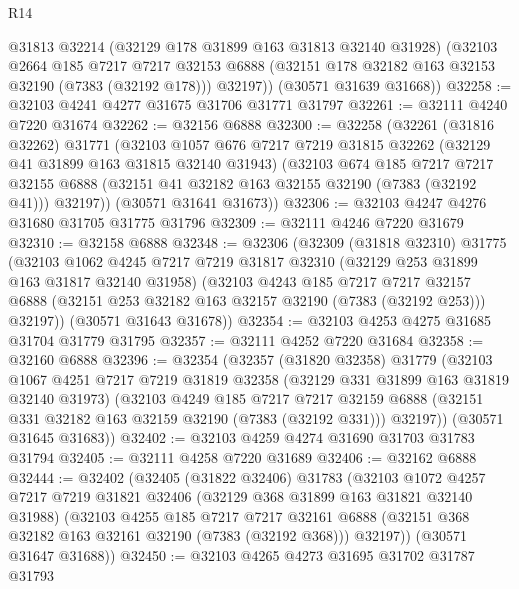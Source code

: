 \begin{lexlean}{R14}
\begin{coremodule}
        @31813
        @32214
        (@32129 @178 @31899 @163 @31813 @32140 @31928)
        (@32103
          @2664
          @185
          @7217
          @7217
          @32153
          @6888
          (@32151 @178 @32182 @163 @32153 @32190 (@7383 (@32192 @178)))
          @32197))
      (@30571 @31639 @31668))
@32258 := @32103 @4241 @4277 @31675 @31706 @31771 @31797
@32261 := @32111 @4240 @7220 @31674
@32262 := @32156 @6888
@32300 := @32258
    (@32261
      (@31816 @32262)
      @31771
      (@32103
        @1057
        @676
        @7217
        @7219
        @31815
        @32262
        (@32129 @41 @31899 @163 @31815 @32140 @31943)
        (@32103
          @674
          @185
          @7217
          @7217
          @32155
          @6888
          (@32151 @41 @32182 @163 @32155 @32190 (@7383 (@32192 @41)))
          @32197))
      (@30571 @31641 @31673))
@32306 := @32103 @4247 @4276 @31680 @31705 @31775 @31796
@32309 := @32111 @4246 @7220 @31679
@32310 := @32158 @6888
@32348 := @32306
    (@32309
      (@31818 @32310)
      @31775
      (@32103
        @1062
        @4245
        @7217
        @7219
        @31817
        @32310
        (@32129 @253 @31899 @163 @31817 @32140 @31958)
        (@32103
          @4243
          @185
          @7217
          @7217
          @32157
          @6888
          (@32151 @253 @32182 @163 @32157 @32190 (@7383 (@32192 @253)))
          @32197))
      (@30571 @31643 @31678))
@32354 := @32103 @4253 @4275 @31685 @31704 @31779 @31795
@32357 := @32111 @4252 @7220 @31684
@32358 := @32160 @6888
@32396 := @32354
    (@32357
      (@31820 @32358)
      @31779
      (@32103
        @1067
        @4251
        @7217
        @7219
        @31819
        @32358
        (@32129 @331 @31899 @163 @31819 @32140 @31973)
        (@32103
          @4249
          @185
          @7217
          @7217
          @32159
          @6888
          (@32151 @331 @32182 @163 @32159 @32190 (@7383 (@32192 @331)))
          @32197))
      (@30571 @31645 @31683))
@32402 := @32103 @4259 @4274 @31690 @31703 @31783 @31794
@32405 := @32111 @4258 @7220 @31689
@32406 := @32162 @6888
@32444 := @32402
    (@32405
      (@31822 @32406)
      @31783
      (@32103
        @1072
        @4257
        @7217
        @7219
        @31821
        @32406
        (@32129 @368 @31899 @163 @31821 @32140 @31988)
        (@32103
          @4255
          @185
          @7217
          @7217
          @32161
          @6888
          (@32151 @368 @32182 @163 @32161 @32190 (@7383 (@32192 @368)))
          @32197))
      (@30571 @31647 @31688))
@32450 := @32103 @4265 @4273 @31695 @31702 @31787 @31793

\end{coremodule}
\end{lexlean}
